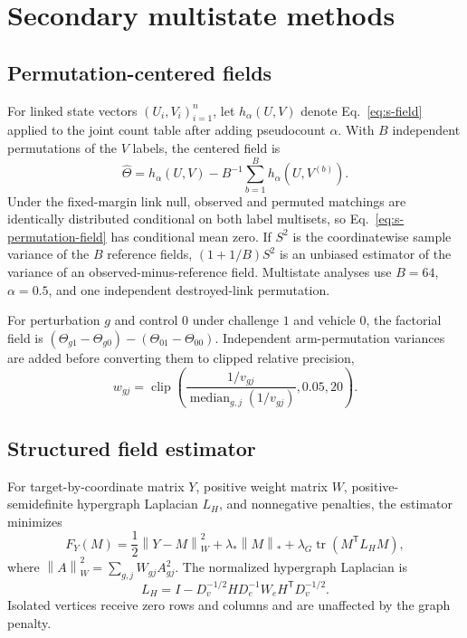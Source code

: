 \documentclass[10pt,a4paper]{article}
\newcommand{\field}{\Theta}
\newcommand{\norm}[1]{\left\lVert#1\right\rVert}
\begin{document}
\section{Secondary multistate methods}

\subsection{Permutation-centered fields}

For linked state vectors $(U_i,V_i)_{i=1}^n$, let $h_\alpha(U,V)$ denote Eq.~\eqref{eq:s-field} applied to the joint count table after adding pseudocount $\alpha$. With $B$ independent permutations of the $V$ labels, the centered field is
\begin{equation}
\widehat\field=h_\alpha(U,V)-B^{-1}\sum_{b=1}^B h_\alpha(U,V^{(b)}).
\label{eq:s-permutation-field}
\end{equation}
Under the fixed-margin link null, observed and permuted matchings are identically distributed conditional on both label multisets, so Eq.~\eqref{eq:s-permutation-field} has conditional mean zero. If $S^2$ is the coordinatewise sample variance of the $B$ reference fields, $(1+1/B)S^2$ is an unbiased estimator of the variance of an observed-minus-reference field. Multistate analyses use $B=64$, $\alpha=0.5$, and one independent destroyed-link permutation.

For perturbation $g$ and control $0$ under challenge $1$ and vehicle $0$, the factorial field is $(\field_{g1}-\field_{g0})-(\field_{01}-\field_{00})$. Independent arm-permutation variances are added before converting them to clipped relative precision,
\[
w_{gj}=\operatorname{clip}\left(
\frac{1/v_{gj}}{\operatorname{median}_{g,j}(1/v_{gj})},0.05,20
\right).
\]

\subsection{Structured field estimator}

For target-by-coordinate matrix $Y$, positive weight matrix $W$, positive-semidefinite hypergraph Laplacian $L_H$, and nonnegative penalties, the estimator minimizes
\begin{equation}
 F_Y(M)=\frac12\norm{Y-M}_{W}^{2}
 +\lambda_*\norm{M}_*+\lambda_G\operatorname{tr}(M^{\mathsf T}L_HM),
 \label{eq:s-objective}
\end{equation}
where $\norm{A}_W^2=\sum_{g,j}W_{gj}A_{gj}^2$. The normalized hypergraph Laplacian is
\[
L_H=I-D_v^{-1/2}HD_e^{-1}W_eH^{\mathsf T}D_v^{-1/2}.
\]
Isolated vertices receive zero rows and columns and are unaffected by the graph penalty.
\end{document}
